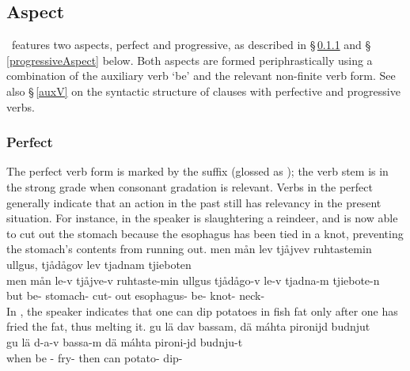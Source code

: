 \subsection{Aspect}\label{aspect}
\PS\ features two aspects, perfect and progressive, as described in §\,\ref{perfectAspect} and §\,\ref{progressiveAspect} below. Both aspects are formed periphrastically using a combination of the auxiliary verb  ‘be’ and the relevant non-finite verb form. 
See also §\,\ref{auxV} on the syntactic structure of clauses with perfective and progressive verbs. 

\subsubsection{Perfect}\label{perfectAspect}
The perfect verb form is marked by the suffix  (glossed as \PRFs); the verb stem is in the strong grade when consonant gradation is relevant. Verbs in the perfect generally indicate that an action in the past still has relevancy in the present situation. For instance, in  the speaker is slaughtering a reindeer, and is now able to cut out the stomach because the esophagus has been tied in a knot, preventing the stomach’s contents from running out. 
\ea\label{perfectEx1}%
\glll	men mån lev tjåjvev ruhtastemin ullgus, tjådågov lev tjadnam tjieboten\\
	men mån le-v tjåjve-v ruhtaste-min ullgus tjådågo-v le-v tjadna-m tjiebote-n\\
	but  be- stomach- cut- out esophagus- be- knot- neck-\\\nopagebreak
{}	
\z
In , the speaker indicates that one can dip potatoes in fish fat only after one has fried the fat, thus melting it.
\ea\label{perfectEx2}%
\glll	gu lä dav bassam, dä máhta pironijd budnjut\\
	gu lä d-a-v bassa-m dä máhta pironi-jd budnju-t\\
	when be\BS{} -\BS{} fry- then can\BS{} potato- dip-\\\nopagebreak
{}	
